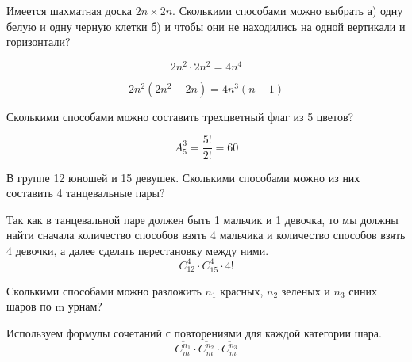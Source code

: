 \begin{task}
    Имеется шахматная доска $2n \times 2n$. Сколькими способами можно выбрать а) одну белую
    и одну черную клетки б) и чтобы они не находились на одной вертикали и горизонтали?
    \begin{solution}[a]
        \begin{equation*}
            2n^2 \cdot 2n^2 = 4n^4
        \end{equation*}
    \end{solution}
    \begin{solution}[б]
        \begin{equation*}
            2n^2(2n^2 - 2n) = 4n^3(n - 1)
        \end{equation*}
    \end{solution}
\end{task}

\begin{task}
    Сколькими способами можно составить трехцветный флаг из 5 цветов?
    \begin{solution}
        \begin{equation*}
            A^3_5 = \frac{5!}{2!} = 60
        \end{equation*}
    \end{solution}
\end{task}

\begin{task}
    В группе 12 юношей и 15 девушек. Сколькими способами можно из них составить 4 танцевальные пары?
    \begin{solution}
        Так как в танцевальной паре должен быть 1 мальчик и 1 девочка, то мы должны найти сначала
        количество способов взять 4 мальчика и количество способов взять 4 девочки, а далее сделать перестановку
        между ними.
        \begin{equation*}
            C^4_{12} \cdot C^4_{15} \cdot 4!
        \end{equation*}
    \end{solution}
\end{task}

\begin{task}
    Сколькими способами можно разложить $n_1$ красных, $n_2$ зеленых и $n_3$ синих
    шаров по m урнам?
    \begin{solution}
        Используем формулы сочетаний с повторениями для каждой категории шара.
        \begin{equation*}
            \overline{C^{n_1}_m} \cdot \overline{C^{n_2}_m} \cdot \overline{C^{n_3}_m}
        \end{equation*}
    \end{solution}
\end{task}

